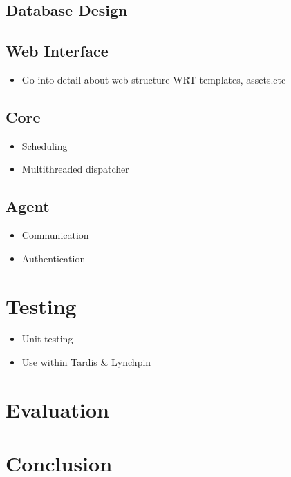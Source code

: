 \documentclass[bsc,logo,twoside]{infthesis}
\begin{document}
\section{Database Design}

\section{Web Interface}
\begin{itemize}
	\item Go into detail about web structure WRT templates, assets.etc
\end{itemize}

\section{Core}
\begin{itemize}
	\item Scheduling
	\item Multithreaded dispatcher
\end{itemize}

\section{Agent}
\begin{itemize}
	\item Communication
	\item Authentication
\end{itemize}

\chapter{Testing}
\begin{itemize}
	\item Unit testing
	\item Use within Tardis \& Lynchpin
\end{itemize}
	
\chapter{Evaluation}

\chapter{Conclusion}
\end{document}
